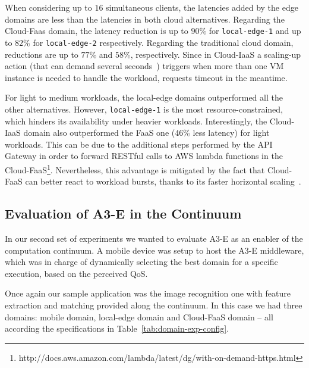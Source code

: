  When considering up to $16$ simultaneous clients, the latencies added by the edge domains are less than the latencies in both cloud alternatives. Regarding the Cloud-Faas domain, the latency reduction is up to $90$\% for \texttt{local-edge-1} and up to $82$\% for \texttt{local-edge-2} respectively. Regarding the traditional cloud domain, reductions are up to $77$\% and $58$\%, respectively. Since in Cloud-IaaS a scaling-up action (that can demand several seconds~\cite{Quatrocchi2016discrete}) triggers when more than one VM instance is needed to handle the workload, requests timeout in the meantime. 
 
 For light to medium workloads, the local-edge domains outperformed all the other alternatives. However, \texttt{local-edge-1} is the most resource-constrained, which hinders its availability under heavier workloads. Interestingly, the Cloud-IaaS domain also outperformed the FaaS one ($46$\% less latency) for light workloads. This can be due to the additional steps performed by the API Gateway in order to forward RESTful calls to AWS lambda functions in the Cloud-FaaS\footnote{http://docs.aws.amazon.com/lambda/latest/dg/with-on-demand-https.html}. Nevertheless, this advantage is mitigated by the fact that Cloud-FaaS can better react to workload bursts, thanks to its faster horizontal scaling~\cite{Villamizar2017lambda,Hendrickson:2016}.



\subsection{Evaluation of A3-E in the Continuum} 

In our second set of experiments we wanted to evaluate A3-E as an enabler of the computation continuum. A mobile device was setup to host the A3-E middleware, which was in charge of dynamically selecting the best domain for a specific execution, based on the perceived QoS. 

Once again our sample application was the image recognition one with feature extraction and matching provided along the continuum. In this case we had three domains: mobile domain, local-edge domain and Cloud-FaaS domain -- all according the specifications in Table~\ref{tab:domain-exp-config}.


